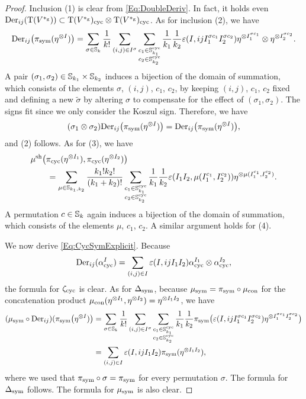 \documentclass[\MainFolder/Text.tex]{subfiles}
\begin{document}
\begin{proof}
Inclusion (1) is clear from \eqref{Eq:DoubleDeriv}. In fact, it holds even $\mathrm{Der}_{ij}(\mathrm{T}(V^{*_{\mathrm{g}}})) \subset  \mathrm{T}(V^{*_{\mathrm{g}}})_{\mathrm{cyc}} \otimes \mathrm{T}(V^{*_{\mathrm{g}}})_{\mathrm{cyc}}$. As for inclusion (2), we have
\[ \mathrm{Der}_{ij}\bigl(\pi_{\mathrm{sym}}(\eta^{\otimes I})\bigr) = \sum_{\sigma\in \mathbb{S}_k}\frac{1}{k!}\sum_{(i,j)\in I^\sigma}\sum_{\substack{c_1\in\mathbb{S}^{\mathrm{cyc}}_{k_1}\\c_2\in\mathbb{S}^{\mathrm{cyc}}_{k_2}}}\frac{1}{k_1}\frac{1}{k_2}\varepsilon(I,i j I_1^{\sigma c_1}I_2^{\sigma c_2})\eta^{\otimes I_1^{\sigma c_1}}\otimes\eta^{\otimes I_2^{\sigma c_2}}. \]
A pair $(\sigma_1,\sigma_2)\in\mathbb{S}_{k_1}\times\mathbb{S}_{k_2}$ induces a bijection of the domain of summation, which consists of the elements $\sigma$, $(i,j)$, $c_1$, $c_2$, by keeping $(i,j)$, $c_1$, $c_2$ fixed and defining a new $\tilde{\sigma}$ by altering $\sigma$ to compensate for the effect of $(\sigma_1, \sigma_2)$. The signs fit since we only consider the Koszul sign. Therefore, we have
\[ (\sigma_1\otimes \sigma_2)\mathrm{Der}_{ij}\bigl(\pi_{\mathrm{sym}}(\eta^{\otimes I})\bigr) = \mathrm{Der}_{ij}\bigl(\pi_{\mathrm{sym}}(\eta^{\otimes I})\bigr), \]
and (2) follows. As for (3), we have
\begin{align*}
& \mu^{\mathrm{sh}}\bigl(\pi_{\mathrm{cyc}}(\eta^{\otimes I_1}),\pi_{\mathrm{cyc}}(\eta^{\otimes I_2})\bigr)\\
&\qquad= \sum_{\mu\in\mathbb{S}_{k_1,k_2}}\frac{k_1!k_2!}{(k_1+k_2)!} \sum_{\substack{c_1\in \mathbb{S}^{\mathrm{cyc}}_{k_1}\\ c_2\in\mathbb{S}^{\mathrm{cyc}}_{k_2}}}\frac{1}{k_1}\frac{1}{k_2}\varepsilon(I_1 I_2,\mu(I_1^{c_1},I_2^{c_2})) \eta^{\otimes \mu(I_1^{c_1},I_2^{c_2})}.
\end{align*}
A permutation $c\in \mathbb{S}_k$ again induces a bijection of the domain of summation, which consists of the elements $\mu$, $c_1$, $c_2$. A similar argument holds for (4).

We now derive \eqref{Eq:CycSymExplicit}. Because
\[ \mathrm{Der}_{ij}(\alpha^I_{\mathrm{cyc}}) = \sum_{(i,j)\in I} \varepsilon(I,ijI_1I_2) \alpha^{I_1}_{\mathrm{cyc}}\otimes\alpha^{I_2}_{\mathrm{cyc}}, \]
the formula for $\zeta_{\mathrm{cyc}}$ is clear. As for $\operatorname{\Delta}_{\mathrm{sym}}$, because $\mu_{\mathrm{sym}} = \pi_{\mathrm{sym}} \circ \mu_{\mathrm{con}}$ for the concatenation product $\mu_{\mathrm{con}}(\eta^{\otimes I_1},\eta^{\otimes I_2}) = \eta^{\otimes I_1 I_2}$, we have
\begin{align*}
(\mu_{\mathrm{sym}}\circ \mathrm{Der}_{ij})(\pi_{\mathrm{sym}}\bigl(\eta^{\otimes I})\bigr) & = \sum_{\sigma\in \mathbb{S}_k}\frac{1}{k!}\sum_{(i,j)\in I^\sigma}\sum_{\substack{c_1\in\mathbb{S}^{\mathrm{cyc}}_{k_1}\\c_2\in\mathbb{S}^{\mathrm{cyc}}_{k_2}}}\frac{1}{k_1}\frac{1}{k_2}\pi_{\mathrm{sym}}\bigl(\varepsilon(I,i j I_1^{\sigma c_1}I_2^{\sigma c_2})\eta^{\otimes I_1^{\sigma c_1}I_2^{\sigma c_2}}\bigr) \\
& = \sum_{(i,j)\in I} \varepsilon(I,ijI_1 I_2) \pi_{\mathrm{sym}}(\eta^{\otimes I_1 I_2}),
\end{align*}
where we used that $\pi_{\mathrm{sym}} \circ \sigma = \pi_{\mathrm{sym}}$ for every permutation $\sigma$. The formula for $\operatorname{\Delta}_{\mathrm{sym}}$ follows. The formula for $\mu_{\mathrm{sym}}$ is also clear.
\end{proof}
\end{document}
